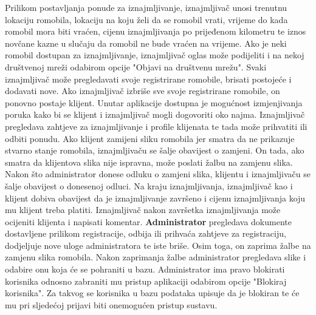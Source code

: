 		Prilikom postavljanja ponude za iznajmljivanje, iznajmljivač unosi trenutnu lokaciju romobila, lokaciju na koju želi da se romobil vrati, vrijeme do kada romobil mora biti vraćen, cijenu iznajmljivanja po prijeđenom kilometru te iznos novčane kazne u slučaju da romobil ne bude vraćen na vrijeme. Ako je neki romobil dostupan za iznajmljivanje, iznajmljivač oglas može podijeliti i na nekoj društvenoj mreži odabirom opcije "Objavi na društvenu mrežu". Svaki iznajmljivač može pregledavati svoje registrirane romobile, brisati postojeće i dodavati nove. Ako iznajmljivač izbriše sve svoje registrirane romobile, on ponovno postaje klijent. Unutar aplikacije dostupna je mogućnost izmjenjivanja poruka kako bi se klijent i iznajmljivač mogli dogovoriti oko najma. Iznajmljivač pregledava zahtjeve za iznajmljivanje i profile klijenata te tada može prihvatiti ili odbiti ponudu. Ako klijent zamijeni sliku romobila jer smatra da ne prikazuje stvarno stanje romobila, iznajmljivaču se šalje obavijest o zamjeni. On tada, ako smatra da klijentova slika nije ispravna, može poslati žalbu na zamjenu slika. Nakon što administrator donese odluku o zamjeni slika, klijentu i iznajmljivaču se šalje obavijest o donesenoj odluci. Na kraju iznajmljivanja, iznajmljivač kao i klijent dobiva obavijest da je iznajmljivanje završeno i cijenu iznajmljivanja koju mu klijent treba platiti. Iznajmljivač nakon završetka iznajmljivanja može ocijeniti klijenta i napisati komentar. \textbf{Administrator} pregledava dokumente dostavljene prilikom registracije, odbija ili prihvaća zahtjeve za registraciju, dodjeljuje nove uloge administratora te iste briše. Osim toga, on zaprima žalbe na zamjenu slika romobila. Nakon zaprimanja žalbe administrator pregledava slike i odabire onu koja će se pohraniti u bazu. Administrator ima pravo blokirati korisnika odnosno zabraniti mu pristup aplikaciji odabirom opcije "Blokiraj korisnika". Za takvog se korisnika u bazu podataka upisuje da je blokiran te će mu pri sljedećoj prijavi biti onemogućen pristup sustavu.
		\newline
		\newline
